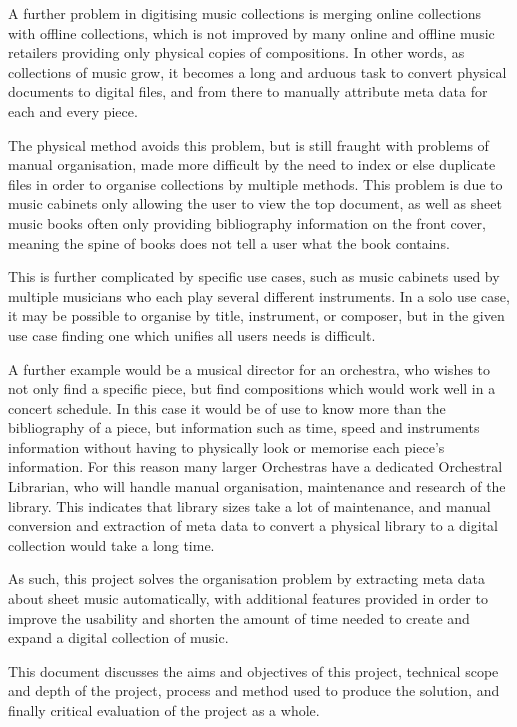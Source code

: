 A further problem in digitising music collections is merging online collections with offline collections, which is not improved by many online and offline music retailers providing only physical copies of compositions\parencite{MusicRoom}. In other words, as collections of music grow, it becomes a long and arduous task to convert physical documents to digital files, and from there to manually attribute meta data for each and every piece.

The physical method avoids this problem, but is still fraught with problems of manual organisation, made more difficult by the need to index or else duplicate files in order to organise collections by multiple methods. This problem is due to music cabinets only allowing the user to view the top document, as well as sheet music books often only providing bibliography information on the front cover, meaning the spine of books does not tell a user what the book contains\parencite{SheetMusicRant}.

This is further complicated by specific use cases, such as music cabinets used by multiple musicians who each play several different instruments. In a solo use case, it may be possible to organise by title, instrument, or composer, but in the given use case finding one which unifies all users needs is difficult.

A further example would be a musical director for an orchestra, who wishes to not only find a specific piece, but find compositions which would work well in a concert schedule. In this case it would be of use to know more than the bibliography of a piece, but information such as time, speed and instruments information without having to physically look or memorise each piece's information. For this reason many larger Orchestras have a dedicated Orchestral Librarian\parencite{MusicLibrarian}, who will handle manual organisation, maintenance and research of the library. This indicates that library sizes take a lot of maintenance, and manual conversion and extraction of meta data to convert a physical library to a digital collection would take a long time.

As such, this project solves the organisation problem by extracting meta data about sheet music automatically, with additional features provided in order to improve the usability and shorten the amount of time needed to create and expand a digital collection of music.

This document discusses the aims and objectives of this project, technical scope and depth of the project, process and method used to produce the solution, and finally critical evaluation of the project as a whole.
\pagebreak

